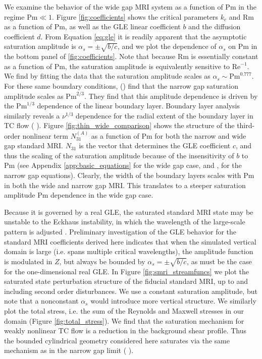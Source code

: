 \documentclass{emulateapj}
\newcommand{\citei}[1]{\citeauthor{#1} \citeyear{#1}}
\newcommand\reye{\mathrm{Re}}
\newcommand\reym{\mathrm{Rm}}
\newcommand{\Pm}{\mathrm{Pm}}
\begin{document}
We examine the behavior of the wide gap MRI system as a function of $\Pm$ in the regime $\Pm \ll 1$. Figure \ref{fig:coefficients} shows the critical parameters $k_c$ and $\reym$ as a function of $\Pm$, as well as the GLE linear coefficient $b$ and the diffusion coefficient $d$. From Equation \ref{eq:gle} it is readily apparent that the asymptotic saturation amplitude is $\alpha_{s} = \pm \sqrt{b/c}$, and we plot the dependence of $\alpha_{s}$ on $\Pm$ in the bottom panel of \ref{fig:coefficients}. 
Note that because $\reym$ is essentially constant as a function of $\Pm$, the saturation amplitude is equivalently sensitive to $\reye^{-1}$. We find by fitting the data that the saturation amplitude scales as $\alpha_{s} \sim \Pm^{0.777}$. For these same boundary conditions, \citeauthor{Umurhan:2007hs} (\citeyear{Umurhan:2007hs}) find that the narrow gap saturation amplitude scales as $\Pm^{2/3}$. They find that this amplitude dependence is driven by the $\Pm^{1/3}$ dependence of the linear boundary layer. Boundary layer analysis similarly reveals a $\nu^{1/3}$ dependence for the radial extent of the boundary layer in TC flow (\citei{Goodman:2002ix}).
Figure \ref{fig:thin_wide_comparison} shows the structure of the third-order nonlinear term $N_{31}^{(A)}$ as a function of $\Pm$ for both the narrow and wide gap standard MRI. $N_{31}$ is the vector that determines the GLE coefficient $c$, and thus the scaling of the saturation amplitude because of the insensitivity of $b$ to $\Pm$ (see Appendix \ref{app:basic_equations} for the wide gap case, and \citei{Umurhan:2007hs}, \citei{Clark:2016} for the narrow gap equations). Clearly, the width of the boundary layers scales with $\Pm$ in both the wide and narrow gap MRI. This translates to a steeper saturation amplitude $\Pm$ dependence in the wide gap case.

Because it is governed by a real GLE, the saturated standard MRI state may be unstable to the Eckhaus instability, in which the wavelength of the large-scale pattern is adjusted \citep[e.g.][]{Hoyle:2006}. Preliminary investigation of the GLE behavior for the standard MRI coefficients derived here indicates that when the simulated vertical domain is large (i.e. spans multiple critical wavelengths), the amplitude function is modulated in $Z$, but always be bounded by $\alpha_{s} = \pm \sqrt{b/c}$, as must be the case for the one-dimensional real GLE. In Figure \ref{fig:smri_streamfuncs} we plot the saturated state perturbation structure of the fiducial standard MRI, up to and including second order disturbances. We use a constant saturation amplitude, but note that a nonconstant $\alpha_{s}$ would introduce more vertical structure. We similarly plot the total stress, i.e. the sum of the Reynolds and Maxwell stresses in our domain (Figure \ref{fig:total_stress}). We find that the saturation mechanism for weakly nonlinear TC flow is a reduction in the background shear profile. Thus the bounded cylindrical geometry considered here saturates via the same mechanism as in the narrow gap limit (\citei{Umurhan:2007hs}). 
\end{document}
